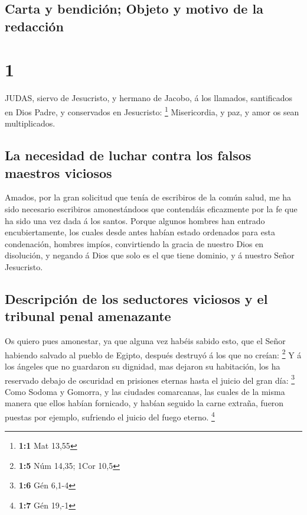 \hypertarget{carta-y-bendiciuxf3n-objeto-y-motivo-de-la-redacciuxf3n}{%
\subsection{Carta y bendición; Objeto y motivo de la
redacción}\label{carta-y-bendiciuxf3n-objeto-y-motivo-de-la-redacciuxf3n}}

\hypertarget{section}{%
\section{1}\label{section}}

 JUDAS, siervo de Jesucristo, y hermano de Jacobo, á los
llamados, santificados en Dios Padre, y conservados en Jesucristo:
\footnote{\textbf{1:1} Mat 13,55}  Misericordia, y paz, y
amor os sean multiplicados.

\hypertarget{la-necesidad-de-luchar-contra-los-falsos-maestros-viciosos}{%
\subsection{La necesidad de luchar contra los falsos maestros
viciosos}\label{la-necesidad-de-luchar-contra-los-falsos-maestros-viciosos}}

 Amados, por la gran solicitud que tenía de escribiros de la
común salud, me ha sido necesario escribiros amonestándoos que
contendáis eficazmente por la fe que ha sido una vez dada á los santos.
 Porque algunos hombres han entrado encubiertamente, los
cuales desde antes habían estado ordenados para esta condenación,
hombres impíos, convirtiendo la gracia de nuestro Dios en disolución, y
negando á Dios que solo es el que tiene dominio, y á nuestro Señor
Jesucristo.

\hypertarget{descripciuxf3n-de-los-seductores-viciosos-y-el-tribunal-penal-amenazante}{%
\subsection{Descripción de los seductores viciosos y el tribunal penal
amenazante}\label{descripciuxf3n-de-los-seductores-viciosos-y-el-tribunal-penal-amenazante}}

 Os quiero pues amonestar, ya que alguna vez habéis sabido
esto, que el Señor habiendo salvado al pueblo de Egipto, después
destruyó á los que no creían: \footnote{\textbf{1:5} Núm 14,35; 1Cor
  10,5}  Y á los ángeles que no guardaron su dignidad, mas
dejaron su habitación, los ha reservado debajo de oscuridad en prisiones
eternas hasta el juicio del gran día: \footnote{\textbf{1:6} Gén 6,1-4}
 Como Sodoma y Gomorra, y las ciudades comarcanas, las
cuales de la misma manera que ellos habían fornicado, y habían seguido
la carne extraña, fueron puestas por ejemplo, sufriendo el juicio del
fuego eterno. \footnote{\textbf{1:7} Gén 19,-1}

